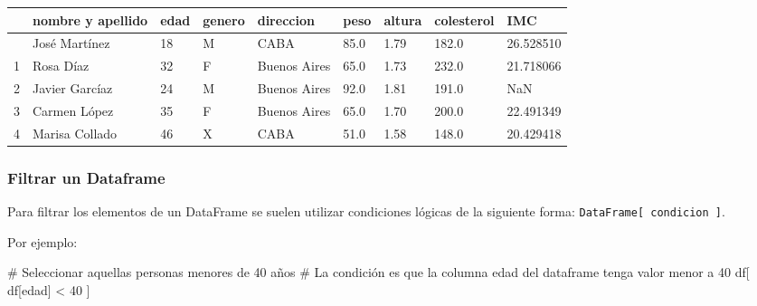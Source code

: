 \documentclass[
  letterpaper,
  DIV=11,
  numbers=noendperiod]{scrreprt}
\newenvironment{Shaded}{\begin{snugshade}}{\end{snugshade}}
\newcommand{\CommentTok}[1]{\textcolor[rgb]{0.37,0.37,0.37}{#1}}
\newcommand{\DecValTok}[1]{\textcolor[rgb]{0.68,0.00,0.00}{#1}}
\newcommand{\NormalTok}[1]{\textcolor[rgb]{0.00,0.23,0.31}{#1}}
\newcommand{\OperatorTok}[1]{\textcolor[rgb]{0.37,0.37,0.37}{#1}}
\newcommand{\StringTok}[1]{\textcolor[rgb]{0.13,0.47,0.30}{#1}}
\begin{document}
\begin{longtable}[]{@{}lllllllll@{}}
\toprule\noalign{}
& nombre y apellido & edad & genero & direccion & peso & altura &
colesterol & IMC \\
\midrule\noalign{}
\endhead
\bottomrule\noalign{}
\endlastfoot
0 & José Martínez & 18 & M & CABA & 85.0 & 1.79 & 182.0 & 26.528510 \\
1 & Rosa Díaz & 32 & F & Buenos Aires & 65.0 & 1.73 & 232.0 &
21.718066 \\
2 & Javier Garcíaz & 24 & M & Buenos Aires & 92.0 & 1.81 & 191.0 &
NaN \\
3 & Carmen López & 35 & F & Buenos Aires & 65.0 & 1.70 & 200.0 &
22.491349 \\
4 & Marisa Collado & 46 & X & CABA & 51.0 & 1.58 & 148.0 & 20.429418 \\
\end{longtable}

\subsubsection{Filtrar un Dataframe}\label{filtrar-un-dataframe}

Para filtrar los elementos de un DataFrame se suelen utilizar
condiciones lógicas de la siguiente forma:
\texttt{DataFrame{[}\ condicion\ {]}}.

Por ejemplo:

\begin{Shaded}
\begin{Highlighting}[]
\CommentTok{\# Seleccionar aquellas personas menores de 40 años}
\CommentTok{\# La condición es que la columna \textquotesingle{}edad\textquotesingle{} del dataframe tenga valor menor a 40}
\NormalTok{df[ df[}\StringTok{\textquotesingle{}edad\textquotesingle{}}\NormalTok{] }\OperatorTok{\textless{}} \DecValTok{40}\NormalTok{ ] }
\end{Highlighting}
\end{Shaded}
\end{document}

